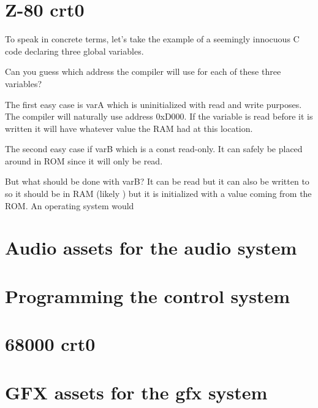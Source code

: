 
\section{Z-80 crt0}
To speak in concrete terms, let's take the example of a seemingly innocuous C code declaring three global variables.



Can you guess which address the compiler will use for each of these three variables?

The first easy case is varA which is uninitialized with read and write purposes. The compiler will naturally use address 0xD000. If the variable is read before it is written it will have whatever value the RAM had at this location. 

The second easy case if varB which is a const read-only. It can safely be placed around  in ROM since it will only be read.

But what should be done with varB? It can be read but it can also be written to so it should be in RAM (likely ) but it is initialized with a value coming from the ROM. An operating system would 

\section{Audio assets for the audio system}

\section{Programming the control system}


\section{68000 crt0}
\pagebreak
{}

\section{GFX assets for the gfx system}

\pagebreak
{}
